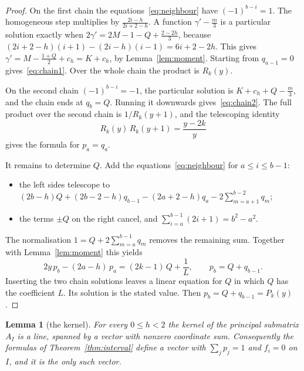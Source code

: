 \documentclass[11pt]{article}
\newtheorem{lemma}[theorem]{Lemma}
\theoremstyle{definition}
\theoremstyle{remark}
\begin{document}
\begin{proof}
On the first chain the equations~\eqref{eq:neighbour} have
$(-1)^{b-i}=1$. The homogeneous step multiplies by $\frac{2i-h}{2i+2-h}$.
A function $\gamma'-\frac m3$ is a particular solution exactly when
$2\gamma'=2M-1-Q+\frac{2-2h}3$, because
$(2i+2-h)(i+1)-(2i-h)(i-1)=6i+2-2h$. This gives
$\gamma'=M-\frac{1+Q}2+c_h=K+c_h$, by Lemma~\ref{lem:moment}. Starting
from $q_{a-1}=0$ gives~\eqref{eq:chain1}. Over the whole chain the
product is $R_k(y)$.

On the second chain $(-1)^{b-i}=-1$, the particular solution is
$K+c_h+Q-\frac m3$, and the chain ends at $q_b=Q$. Running it downwards
gives~\eqref{eq:chain2}. The full product over the second chain is
$1/R_k(y+1)$, and the telescoping identity
\begin{equation}\label{eq:telescope}
R_k(y)\,R_k(y+1)=\frac{y-2k}{y}
\end{equation}
gives the formula for $p_a=q_a$.

It remains to determine $Q$. Add the equations~\eqref{eq:neighbour}
for $a\le i\le b-1$:
\begin{itemize}
\item the left sides telescope to
$(2b-h)Q+(2b-2-h)q_{b-1}-(2a+2-h)q_a-2\sum_{m=a+1}^{b-2}q_m$;
\item the terms $\pm Q$ on the right cancel, and
$\sum_{i=a}^{b-1}(2i+1)=b^2-a^2$.
\end{itemize}
The normalisation $1=Q+2\sum_{m=a}^{b-1}q_m$ removes the remaining sum.
Together with Lemma~\ref{lem:moment} this yields
\begin{equation}\label{eq:endpoints}
2y\,p_b-(2a-h)\,p_a=(2k-1)\,Q+\frac1L,\qquad p_b=Q+q_{b-1}.
\end{equation}
Inserting the two chain solutions leaves a linear equation for $Q$ in
which $Q$ has the coefficient $L$. Its solution is the stated value.
Then $p_b=Q+q_{b-1}=P_k(y)$.
\end{proof}

\begin{lemma}[the kernel]\label{lem:kernel}
For every $0\le h<2$ the kernel of the principal submatrix $A_I$ is a
line, spanned by a vector with nonzero coordinate sum. Consequently the
formulas of Theorem~\ref{thm:interval} define a vector with
$\sum_jp_j=1$ and $f_i=0$ on $I$, and it is the only such vector.
\end{lemma}
\end{document}
